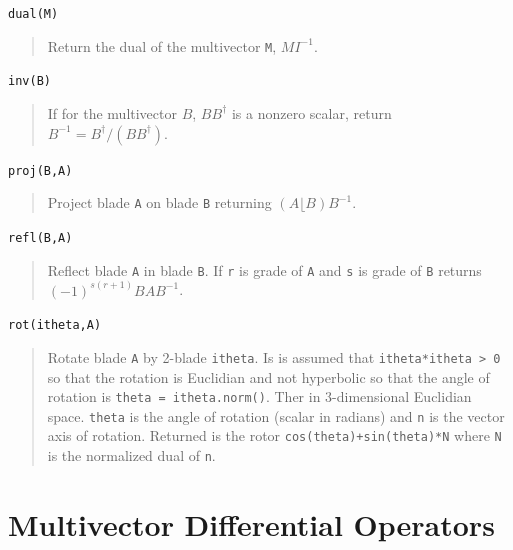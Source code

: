 \documentclass[12pt,twoside,openright]{memoir}
\newcommand{\lp}{\left (}
\newcommand{\rp}{\right )}
\newcommand{\R}{\dagger}
\newcommand{\paren}[1]{\lp {#1} \rp}
\newcommand{\T}[1]{\texttt{#1}}
\begin{document}
\T{dual(M)}
\begin{quote}
   Return the dual of the multivector \T{M}, $MI^{-1}$.
\end{quote}
\T{inv(B)}
\begin{quote}
   If for the multivector $B$, $BB^{\R}$ is a nonzero scalar, return $B^{-1} = B^{\R}/(BB^{\R})$.
\end{quote}
\T{proj(B,A)}
\begin{quote}
   Project blade \T{A} on blade \T{B} returning $\paren{A\lfloor B}B^{-1}$.
\end{quote}
\T{refl(B,A)}
\begin{quote}
   Reflect blade \T{A} in blade \T{B}. If \T{r} is grade of \T{A} and \T{s} is grade of \T{B}
   returns $(-1)^{s(r+1)}BAB^{-1}$.
\end{quote}
\T{rot(itheta,A)}
\begin{quote}
   Rotate blade \T{A} by 2-blade \T{itheta}.  Is is assumed that \T{itheta*itheta > 0} so that
   the rotation is Euclidian and not hyperbolic so that the angle of
   rotation is \T{theta = itheta.norm()}.  Ther in 3-dimensional Euclidian space. \T{theta} is the angle of rotation (scalar in radians) and
   \T{n} is the vector axis of rotation.  Returned is the rotor \T{cos(theta)+sin(theta)*N} where \T{N} is
   the normalized dual of \T{n}.
\end{quote}

\section{Multivector Differential Operators}
\end{document}
